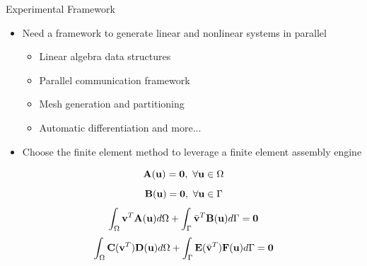 \documentclass{beamer}
\begin{document}
\begin{frame}{Experimental Framework}

  \begin{itemize}
  \item Need a framework to generate linear and nonlinear systems in
    parallel
    \begin{itemize}
    \item Linear algebra data structures
    \item Parallel communication framework
    \item Mesh generation and partitioning
    \item Automatic differentiation and more...
    \end{itemize}
  \item Choose the finite element method to leverage a finite element
    assembly engine
  \end{itemize}

  \[
  \mathbf{A}(\mathbf{u}) = \mathbf{0},\ \forall \mathbf{u} \in \Omega
  \]
  \[
  \mathbf{B}(\mathbf{u}) = \mathbf{0},\ \forall \mathbf{u} \in \Gamma
  \]
  \[
  \int_{\Omega} \mathbf{v}^T \mathbf{A}(\mathbf{u}) d\Omega + \int_{\Gamma}
  \bar{\mathbf{v}}^T \mathbf{B}(\mathbf{u}) d\Gamma = \mathbf{0}
  \]
  \[
  \int_{\Omega} \mathbf{C}(\mathbf{v}^T) \mathbf{D}(\mathbf{u}) d\Omega +
  \int_{\Gamma} \mathbf{E}(\bar{\mathbf{v}}^T) \mathbf{F}(\mathbf{u}) d\Gamma = \mathbf{0}
  \]

\end{frame}
\end{document}
